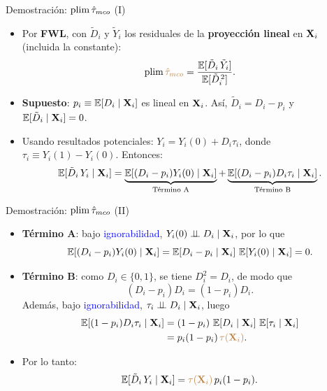 \documentclass[10pt, xcolor=dvipsnames]{beamer}
\begin{document}
\begin{frame}{Demostración: $\plim \hat\tau_{mco}$ (I)}\label{Demostracion-MCO}
\begin{itemize}
    \item Por \textbf{FWL}, con \(\tilde D_i\) y \(\tilde Y_i\) los residuales de la \textbf{proyección lineal} en \(\textbf{X}_i\) (incluida la constante):
    \[
        \plim \brown{\hat\tau_{mco}} = \frac{\EX[\tilde D_i \, \tilde Y_i]}{\EX[\tilde D_i^{\,2}]}.
    \]
    \item \textbf{Supuesto}: \(p_i \equiv \operatorname{\mathbb{E}}[D_i \mid \textbf{X}_i]\) es lineal en \(\textbf{X}_i\). Así, \(\tilde D_i = D_i - p_i\) y \(\operatorname{\mathbb{E}}[\tilde D_i \mid \textbf{X}_i]=0\).
    \item Usando resultados potenciales: \(Y_i = Y_i(0) + D_i \tau_i\), donde \(\tau_i \equiv Y_i(1) - Y_i(0)\). Entonces:
    \[
        \operatorname{\mathbb{E}}[\tilde D_i \, Y_i \mid \textbf{X}_i]
        = \underbrace{\operatorname{\mathbb{E}}[(D_i - p_i) Y_i(0) \mid \textbf{X}_i]}_{\text{Término A}}
        + \underbrace{\operatorname{\mathbb{E}}[(D_i - p_i) D_i \tau_i \mid \textbf{X}_i]}_{\text{Término B}}.
    \]
\end{itemize}
\end{frame}


\begin{frame}{Demostración: $\plim \hat\tau_{mco}$ (II)}
\begin{itemize}
    \item \textbf{Término A}: bajo \textcolor{blue}{ignorabilidad}, \(Y_i(0) \perp \!\!\! \perp D_i \mid \textbf{X}_i\), por lo que
    \[
        \operatorname{\mathbb{E}}[(D_i - p_i) Y_i(0) \mid \textbf{X}_i]
        = \operatorname{\mathbb{E}}[D_i - p_i \mid \textbf{X}_i] \, \operatorname{\mathbb{E}}[Y_i(0) \mid \textbf{X}_i] = 0.
    \]
    \item \textbf{Término B}: como \(D_i \in \{0,1\}\), se tiene \(D_i^2 = D_i\), de modo que
    \[
        (D_i - p_i) D_i = (1 - p_i) D_i.
    \]
    Además, bajo \textcolor{blue}{ignorabilidad}, \(\tau_i \perp \!\!\! \perp D_i \mid \textbf{X}_i\), luego
    \begin{align*}
        \operatorname{\mathbb{E}}[(1 - p_i) D_i \tau_i \mid \textbf{X}_i]
        &= (1 - p_i) \, \operatorname{\mathbb{E}}[D_i \mid \textbf{X}_i] \, \operatorname{\mathbb{E}}[\tau_i \mid \textbf{X}_i] \\
        &= p_i(1 - p_i) \, \textcolor{brown}{\tau(\textbf{X}_i)}.
    \end{align*}
    \item Por lo tanto:
    \[
        \operatorname{\mathbb{E}}[\tilde D_i \, Y_i \mid \textbf{X}_i] = \textcolor{brown}{\tau(\textbf{X}_i)} \, p_i(1 - p_i).
    \]
\end{itemize}
\end{frame}
\end{document}
